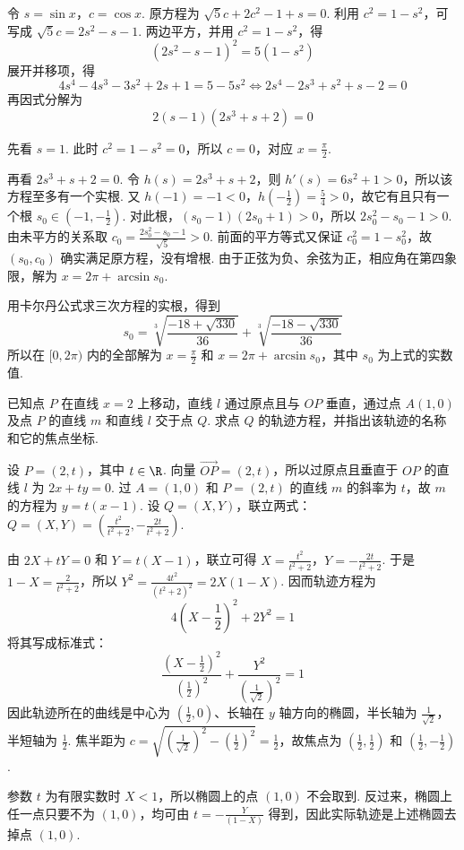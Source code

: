 \begin{solution}
令 \(s=\sin x\)，\(c=\cos x\). 原方程为 \( \sqrt5c+2c^2-1+s=0\). 利用 \(c^2=1-s^2\)，可写成
\(\sqrt5c=2s^2-s-1\). 两边平方，并用 \(c^2=1-s^2\)，得
\[
\left(2s^2-s-1\right)^2=5\left(1-s^2\right)
\]
展开并移项，得
\[
4s^4-4s^3-3s^2+2s+1=5-5s^2
\Longleftrightarrow 2s^4-2s^3+s^2+s-2=0
\]
再因式分解为
\[
2(s-1)\left(2s^3+s+2\right)=0
\]

先看 \(s=1\). 此时 \(c^2=1-s^2=0\)，所以 \(c=0\)，对应 \(x=\frac\pi2\).

再看 \(2s^3+s+2=0\). 令 \(h(s)=2s^3+s+2\)，则 \(h'(s)=6s^2+1>0\)，所以该方程至多有一个实根. 又 \(h(-1)=-1<0\)，\(h(-\frac12)=\frac54>0\)，故它有且只有一个根 \(s_0\in(-1,-\frac12)\). 对此根，\((s_0-1)(2s_0+1)>0\)，所以 \(2s_0^2-s_0-1>0\). 由未平方的关系取
\(c_0=\frac{2s_0^2-s_0-1}{\sqrt5}>0\). 前面的平方等式又保证 \(c_0^2=1-s_0^2\)，故 \((s_0,c_0)\) 确实满足原方程，没有增根. 由于正弦为负、余弦为正，相应角在第四象限，解为 \(x=2\pi+\arcsin s_0\).

用卡尔丹公式求三次方程的实根，得到
\[
s_0=\sqrt[3]{\frac{-18+\sqrt{330}}{36}}+\sqrt[3]{\frac{-18-\sqrt{330}}{36}}
\]
所以在 \([0,2\pi)\) 内的全部解为 \(x=\frac\pi2\) 和 \(x=2\pi+\arcsin s_0\)，其中 \(s_0\) 为上式的实数值.
\end{solution}

\begin{problem}
已知点 \(P\) 在直线 \(x=2\) 上移动，直线 \(l\) 通过原点且与 \(OP\) 垂直，通过点 \(A(1,0)\) 及点 \(P\) 的直线 \(m\) 和直线 \(l\) 交于点 \(Q\). 求点 \(Q\) 的轨迹方程，并指出该轨迹的名称和它的焦点坐标.
\end{problem}

\begin{solution}
设 \(P=(2,t)\)，其中 \(t\in\R\). 向量 \(\overrightarrow{OP}=(2,t)\)，所以过原点且垂直于 \(OP\) 的直线 \(l\) 为 \(2x+ty=0\). 过 \(A=(1,0)\) 和 \(P=(2,t)\) 的直线 \(m\) 的斜率为 \(t\)，故 \(m\) 的方程为 \(y=t(x-1)\). 设 \(Q=(X,Y)\)，联立两式：
\(Q=(X,Y)=\left(\frac{t^2}{t^2+2},-\frac{2t}{t^2+2}\right)\).

由 \(2X+tY=0\) 和 \(Y=t(X-1)\)，联立可得 \(X=\frac{t^2}{t^2+2}\)，\(Y=-\frac{2t}{t^2+2}\).
于是 \(1-X=\frac2{t^2+2}\)，所以
\(Y^2=\frac{4t^2}{(t^2+2)^2}=2X(1-X)\). 因而轨迹方程为
\[
4\left(X-\frac12\right)^2+2Y^2=1
\]
将其写成标准式：
\[
\frac{\left(X-\frac12\right)^2}{\left(\frac12\right)^2}
+\frac{Y^2}{\left(\frac1{\sqrt2}\right)^2}=1
\]
因此轨迹所在的曲线是中心为 \(\left(\frac12,0\right)\)、长轴在 \(y\) 轴方向的椭圆，半长轴为 \(\frac1{\sqrt2}\)，半短轴为 \(\frac12\). 焦半距为
\(c=\sqrt{\left(\frac1{\sqrt2}\right)^2-\left(\frac12\right)^2}=\frac12\)，故焦点为 \(\left(\frac12,\frac12\right)\) 和 \(\left(\frac12,-\frac12\right)\).

参数 \(t\) 为有限实数时 \(X<1\)，所以椭圆上的点 \((1,0)\) 不会取到. 反过来，椭圆上任一点只要不为 \((1,0)\)，均可由 \(t=-\frac{Y}{(1-X)}\) 得到，因此实际轨迹是上述椭圆去掉点 \((1,0)\).
\end{solution}

